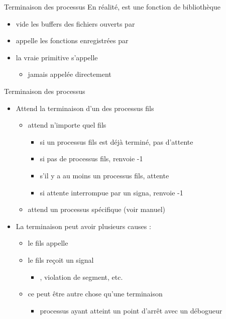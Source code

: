 \begin {frame} {Terminaison des processus}
    En réalité,  est une fonction de bibliothèque
    \begin {itemize}
	\item vide les buffers des fichiers ouverts par 
	\item appelle les fonctions enregistrées par 
	\item la vraie primitive s'appelle 
	    \begin {itemize}
		\item jamais appelée directement
	    \end {itemize}
    \end {itemize}
\end {frame}

\begin {frame} {Terminaison des processus}

    \vspace* {-8mm}

    \begin {itemize}
	\item Attend la terminaison d'un des processus fils
	    \begin {itemize}
		\item {} attend n'importe quel fils
		    \begin {itemize}
			\item si un processus fils est déjà terminé,
			    pas d'attente
			\item si pas de processus fils, renvoie -1
			\item s'il y a au moins un processus fils, attente
			\item si attente interrompue par un signa, renvoie -1
		    \end {itemize}
		\item {} attend un processus spécifique
		    (voir manuel)
	    \end {itemize}
	\item La terminaison peut avoir plusieurs causes :
	    \begin {itemize}
		\item le fils appelle 
		\item le fils reçoit un signal
		    \begin {itemize}
			\item {} , violation
			    de segment, etc.
		    \end {itemize}
		\item ce peut être autre chose qu'une terminaison
		    \begin {itemize}
			\item processus ayant atteint un point d'arrêt avec
			    un débogueur
		    \end {itemize}

	    \end {itemize}
    \end {itemize}
\end {frame}

